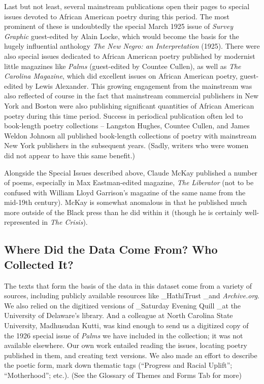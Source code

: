 \documentclass[
  letterpaper,
  DIV=11,
  numbers=noendperiod]{scrartcl}
\begin{document}
Last but not least, several mainstream publications open their pages to
special issues devoted to African American poetry during this period.
The most prominent of these is undoubtedly the special March 1925 issue
of \emph{Survey Graphic} guest-edited by Alain Locke, which would become
the basis for the hugely influential anthology \emph{The New Negro: an
Interpretation} (1925). There were also special issues dedicated to
African American poetry published by modernist little magazines like
\emph{Palms} (guest-edited by Countee Cullen), as well as \emph{The
Carolina Magazine}, which did excellent issues on African American
poetry, guest-edited by Lewis Alexander. This growing engagement from
the mainstream was also reflected of course in the fact that mainstream
commercial publishers in New York and Boston were also publishing
significant quantities of African American poetry during this time
period. Success in periodical publication often led to book-length
poetry collections -- Langston Hughes, Countee Cullen, and James Weldon
Johnosn all published book-length collections of poetry with mainstream
New York publishers in the subsequent years. (Sadly, writers who were
women did not appear to have this same benefit.)

Alongside the Special Issues described above, Claude McKay published a
number of poems, especially in Max Eastman-edited magazine, \emph{The
Liberator} (not to be confused with William Lloyd Garrison's magazine of
the same name from the mid-19th century). McKay is somewhat anomalous in
that he published much more outside of the Black press than he did
within it (though he is certainly well-represented in \emph{The
Crisis}).

\subsection{\texorpdfstring{\textbf{Where Did the Data Come From? Who
Collected It?
}}{Where Did the Data Come From? Who Collected It? }}\label{where-did-the-data-come-from-who-collected-it}

The texts that form the basis of the data in this dataset come from a
variety of sources, including publicly available resources like
\_HathiTrust \_and \emph{Archive.org}. We also relied on the digitized
versions of \_Saturday Evening Quill \_at the University of Delaware's
library. And a colleague at North Carolina State University, Madhusudan
Kutti, was kind enough to send us a digitized copy of the 1926 special
issue of \emph{Palms} we have included in the collection; it was not
available elsewhere. Our own work entailed reading the issues, locating
poetry published in them, and creating text versions. We also made an
effort to describe the poetic form, mark down thematic tags (``Progress
and Racial Uplift''; ``Motherhood''; etc.). (See the Glossary of Themes
and Forms Tab for more)
\end{document}
